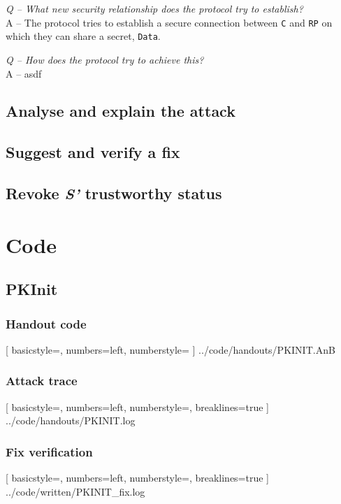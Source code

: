 \documentclass{article}
\newcommand\Q[1]{
	\leavevmode\par
	\noindent
	\emph{Q -- #1}
	\\
}
\newcommand\A[1]{
	A -- #1
}
\begin{document}
\Q{What new security relationship does the protocol try to establish?}
\A{
	The protocol tries to establish a secure connection between \texttt{C}
	and \texttt{RP} on which they can share a secret, \texttt{Data}.
}

\Q{How does the protocol try to achieve this?}
\A{
	asdf
}

\subsection{Analyse and explain the attack}

\subsection{Suggest and verify a fix}

\subsection{Revoke \emph{S'} trustworthy status}

\appendix

\section{Code}

\subsection{PKInit}

\subsubsection{Handout code}

	[
		basicstyle=\footnotesize,
		numbers=left, 
		numberstyle=\tiny
	]
	{../code/handouts/PKINIT.AnB}

\subsubsection{Attack trace}
\label{app:pktrace}

	[
		basicstyle=\footnotesize,
		numbers=left,
		numberstyle=\tiny,
		breaklines=true
	]
	{../code/handouts/PKINIT.log}
	
\subsubsection{Fix verification}
\label{app:pkfix-log}

	[
		basicstyle=\footnotesize,
		numbers=left,
		numberstyle=\tiny,
		breaklines=true
	]
	{../code/written/PKINIT_fix.log}
\end{document}
